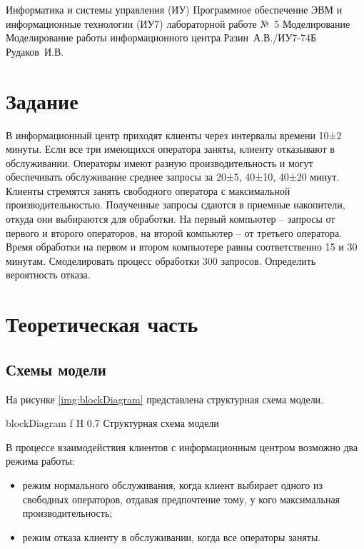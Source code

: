 \documentclass{bmstu}
\begin{document}
\makereporttitle
{Информатика и системы управления (ИУ)}
{Программное обеспечение ЭВМ и информационные технологии (ИУ7)}
{лабораторной работе №~5}
{Моделирование}
{Моделирование работы информационного центра}
{}
{Разин~А.В./ИУ7-74Б}
{Рудаков~И.В.}

\setcounter{page}{2}
\renewcommand{\contentsname}{Содержание} 
\tableofcontents

\chapter{Задание}

В информационный центр приходят клиенты через интервалы времени 10±2 минуты. Если все три имеющихся оператора заняты, клиенту отказывают в обслуживании. Операторы имеют разную производительность и могут обеспечивать обслуживание среднее запросы за 20±5, 40±10, 40±20 минут. Клиенты стремятся занять свободного оператора с максимальной производительностью. Полученные запросы сдаются в приемные накопители, откуда они выбираются для обработки. На первый компьютер -- запросы от первого и второго операторов, на второй компьютер -- от третьего оператора. Время обработки на первом и втором компьютере равны соответственно 15 и 30 минутам. Смоделировать процесс обработки 300 запросов. Определить вероятность отказа.

\chapter{Теоретическая часть}

\section{Схемы модели}

На рисунке \ref{img:blockDiagram} представлена структурная схема модели.


{blockDiagram} %
{f} %
{H} %
{0.7\textwidth} %
{Структурная схема модели} %


В процессе взаимодействия клиентов с информационным центром возможно два режима работы:

\begin{itemize}
    \item режим нормального обслуживания, когда клиент выбирает одного из свободных операторов, отдавая предпочтение тому, у кого максимальная производительность;
    \item режим отказа клиенту в обслуживании, когда все операторы заняты.
\end{itemize}
\end{document}
